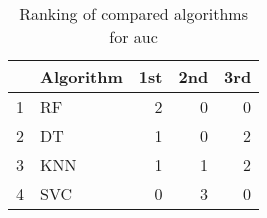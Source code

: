 \begin{table}
\footnotesize
\caption{Ranking of compared algorithms for auc}
\label{tab:places auc}
\begin{tabular}{llrrr}
\hline
 & Algorithm & 1st & 2nd & 3rd \\
\hline
1 & RF & 2 & 0 & 0 \\
2 & DT & 1 & 0 & 2 \\
3 & KNN & 1 & 1 & 2 \\
4 & SVC & 0 & 3 & 0 \\
\hline
\end{tabular}
\end{table}
